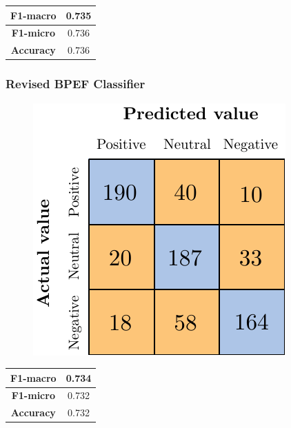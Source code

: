 \begin{center}
	\begin{tabular}{ | c | c | } 
		\hline
		\textbf{F1-macro} & 0.735 \\
		\hline
		\textbf{F1-micro} & 0.736 \\ 
		\hline
		\textbf{Accuracy} & 0.736 \\ 
		\hline
	\end{tabular}
\end{center}

\subsubsection{Revised BPEF Classifier}

\begin{figure}[H]
	\centering
	\includegraphics[scale=1]{figures/conf_matrices/twitter_snt_bpef/twitter_snt_bpef_afs.pdf}
	\label{fig:tw_snt_bpef_tst}
\end{figure}

\begin{center}
	\begin{tabular}{ | c | c | } 
		\hline
		\textbf{F1-macro} & 0.734 \\
		\hline
		\textbf{F1-micro} & 0.732 \\ 
		\hline
		\textbf{Accuracy} & 0.732 \\ 
		\hline
	\end{tabular}
\end{center}







